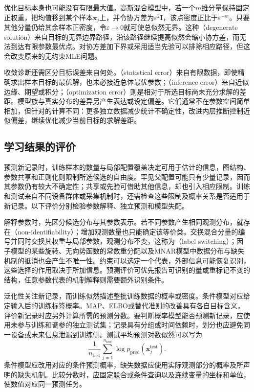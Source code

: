 优化目标本身也可能没有有限最大值。高斯混合模型中，若一个$m$维分量保持固定正权重，把均值移到某个样本$\bm{x}_j$上，并令协方差为$\varepsilon^2\bm{I}$，该点密度正比于$\varepsilon^{-m}$。只要其他分量仍给其余样本正密度，令$\varepsilon\to0$就可使总似然无界。这种（degenerate solution）来自目标的无界边界路径，沿该路径继续提高似然会缩小协方差，而无法到达有限参数最优点。对协方差加下界或采用适当先验可以排除相应路径，但这会改变原来的无约束MLE问题。

收敛诊断还需区分目标误差来自何处。（statistical error）来自有限数据，即使精确求出样本目标的最优解，也未必接近总体最优参数；（inference error）来自近似边缘、期望或积分；（optimization error）则是相对于所选目标尚未充分求解的差距。模型族与真实分布的差异另产生表达或设定偏差。它们通常不在参数空间简单相加，但针对的计算不同：更多独立数据减少统计不确定性，改进内层推断控制近似偏差，继续优化减少当前目标的求解差距。

\subsection{学习结果的评价}
\label{sec:pgm-parameter-learning-evaluation}

预测新记录时，训练样本的数量与局部配置覆盖决定可用于估计的信息，图结构、参数共享和正则化则限制所选候选的自由度。罕见父配置可能只有少量记录，因而其参数仍有较大不确定性；共享或先验可借助其他信息，却也引入相应限制。训练和测试来自不同设备群体或采集机制时，还需检查这些限制及概率关系是否适用于新记录。以下评价分别检验参数解释、独立预测和模型失配。

解释参数时，先区分候选分布与其参数表示。若不同参数产生相同观测分布，就存在（non-identifiability）；增加观测数量也只能确定该等价类。交换混合分量的编号并同时交换其权重与局部参数，观测分布不变，这称为（label switching）；因子模型的某些旋转、无向势函数的常数重分配以及MNAR模型中数据分布与缺失机制的抵消也会产生不唯一性。约束可以选定一个代表，外部信息可能恢复识别，这些选择的作用取决于所加信息。预测评价可优先报告可识别的量或重标记不变的结构，任意参数代表的机制解释则需要额外识别条件。

泛化性关注新记录，而训练似然描述整批训练数据的概率或密度。条件模型对应给定输入后的训练标签概率。MAP、ELBO或替代准则的改善具有各自目标含义，评价新记录时应另外计算所需的预测分数。要判断概率模型能否预测新记录，应使用未参与训练和调参的独立测试集；记录具有分组或时间依赖时，划分也应避免同一设备或未来信息泄漏到训练侧。测试平均预测对数似然可以写为
\[
  \frac{1}{n_{\mathrm{test}}}
  \sum_{j=1}^{n_{\mathrm{test}}}
    \log p_{\mathrm{pred}}(\bm{x}^{\mathrm{test}}_j).
\]
条件模型应改用对应的条件预测概率，缺失数据应使用实际观测部分的概率及所声明的缺失机制。比较分数时，应固定联合或条件查询以及连续变量的坐标和单位，使数值对应同一预测任务。


